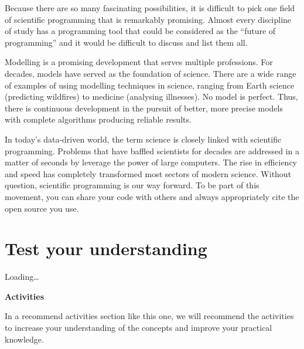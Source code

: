 \documentclass[
]{book}
\begin{document}
Because there are so many fascinating possibilities, it is difficult to pick one field of scientific programming that is remarkably promising. Almost every discipline of study has a programming tool that could be considered as the ``future of programming'' and it would be difficult to discuss and list them all.

Modelling is a promising development that serves multiple professions. For decades, models have served as the foundation of science. There are a wide range of examples of using modelling techniques in science, ranging from Earth science (predicting wildfires) to medicine (analysing illnesses). No model is perfect. Thus, there is continuous development in the pursuit of better, more precise models with complete algorithms producing reliable results.

In today's data-driven world, the term science is closely linked with scientific programming. Problems that have baffled scientists for decades are addressed in a matter of seconds by leverage the power of large computers. The rise in efficiency and speed has completely transformed most sectors of modern science. Without question, scientific programming is our way forward. To be part of this movement, you can share your code with others and always appropriately cite the open source you use.

\hypertarget{test-your-understanding-2}{%
\section{Test your understanding}\label{test-your-understanding-2}}

Loading\ldots{}

\textbf{Activities}

In a recommend activities section like this one, we will recommend the activities to increase your understanding of the concepts and improve your practical knowledge.
\end{document}
